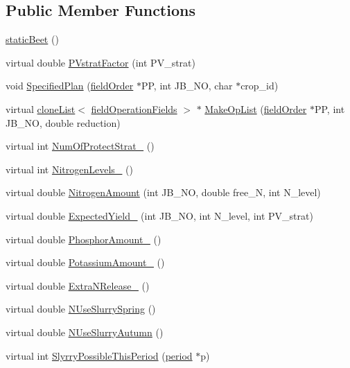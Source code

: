 \subsection*{Public Member Functions}
\begin{DoxyCompactItemize}
\item 
\hyperlink{classstatic_beet_a9a5355c6bd94e14512d39563d4677d93}{staticBeet} ()
\item 
virtual double \hyperlink{classstatic_beet_a70822a52271755f931ac0ae449e1f339}{PVstratFactor} (int PV\_\-strat)
\item 
void \hyperlink{classstatic_beet_a5ee0ed20286108fd34901d74099de424}{SpecifiedPlan} (\hyperlink{classfield_order}{fieldOrder} $\ast$PP, int JB\_\-NO, char $\ast$crop\_\-id)
\item 
virtual \hyperlink{classclone_list}{cloneList}$<$ \hyperlink{classfield_operation_fields}{fieldOperationFields} $>$ $\ast$ \hyperlink{classstatic_beet_afb13dbf6327c15857a6d9f1b1822b766}{MakeOpList} (\hyperlink{classfield_order}{fieldOrder} $\ast$PP, int JB\_\-NO, double reduction)
\item 
virtual int \hyperlink{classstatic_beet_afce21aaadaf9e47e51b613bedf0aeca1}{NumOfProtectStrat\_\-} ()
\item 
virtual int \hyperlink{classstatic_beet_a399a5b014205aaa03ddb6ea0eeecd122}{NitrogenLevels\_\-} ()
\item 
virtual double \hyperlink{classstatic_beet_a98d8ce60295b7390603ce557a7f47fb3}{NitrogenAmount} (int JB\_\-NO, double free\_\-N, int N\_\-level)
\item 
virtual double \hyperlink{classstatic_beet_abfb3ec226a41b76f49b28240cd9e1aaf}{ExpectedYield\_\-} (int JB\_\-NO, int N\_\-level, int PV\_\-strat)
\item 
virtual double \hyperlink{classstatic_beet_afe8f6891ceee71739788e01393a13bec}{PhosphorAmount\_\-} ()
\item 
virtual double \hyperlink{classstatic_beet_a4f19a0d8935d02ca200825d92df403d9}{PotassiumAmount\_\-} ()
\item 
virtual double \hyperlink{classstatic_beet_a22b6ff9f461a6c77c5d6f09b8f28ed89}{ExtraNRelease\_\-} ()
\item 
virtual double \hyperlink{classstatic_beet_a9a9f897edecad06aaa42d1f1875fd111}{NUseSlurrySpring} ()
\item 
virtual double \hyperlink{classstatic_beet_a3f8cb12e397cc68f0a2232f962c4ae08}{NUseSlurryAutumn} ()
\item 
virtual int \hyperlink{classstatic_beet_ac4c74287080f0312d824b0f0bc493b70}{SlyrryPossibleThisPeriod} (\hyperlink{classperiod}{period} $\ast$p)
\end{DoxyCompactItemize}


